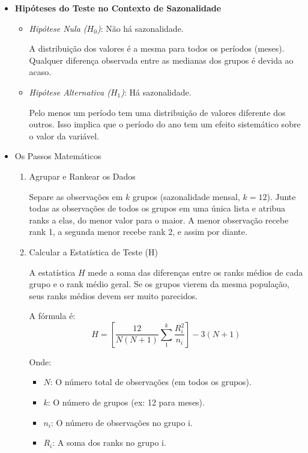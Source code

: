 \documentclass[ 12pt,a4paper ]{article} %
\begin{document}
	\begin{itemize}
		
	
	\item  \textbf{Hipóteses do Teste no Contexto de Sazonalidade}
	
	\begin{itemize}
		
	
	\item \textit{Hipótese Nula ($H_0$)}: Não há sazonalidade.
	
	A distribuição dos valores é a mesma para todos os períodos (meses). Qualquer diferença observada entre as medianas dos grupos é devida ao acaso.
	
	\item \textit{Hipótese Alternativa ($H_1$)}: Há sazonalidade.
	
	Pelo menos um período tem uma distribuição de valores diferente dos outros. Isso implica que o período do ano tem um efeito sistemático sobre o valor da variável.
\end{itemize}
	\item Os Passos Matemáticos 
	
	\begin{enumerate}
		\item Agrupar e Rankear os Dados
		
		Separe as observações em $k$ grupos (sazonalidade mensal, $k=12$).
		Junte todas as observações de todos os grupos em uma única lista e atribua ranks a elas, do menor valor para o maior. A menor observação recebe rank 1, a segunda menor recebe rank 2, e assim por diante.
		
		\item Calcular a Estatística de Teste (H)
		
		A estatística $H$ mede a soma das diferenças entre os ranks médios de cada grupo e o rank médio geral. Se os grupos vierem da mesma população, seus ranks médios devem ser muito parecidos.
		
		A fórmula é: $$H = \left[\dfrac{12}{N(N+1)} \sum_{1}^{k}\dfrac{R_i^2}{n_i}\right] - 3 (N+1)$$
		
		Onde:
		\begin{itemize}
			
		
		\item $N$: O número total de observações (em todos os grupos).
		
		\item $k$: O número de grupos (ex: 12 para meses).
		
		\item $n_i$: O número de observações no grupo i.
		\item $R_i$: A soma dos ranks no grupo i.
		

\end{itemize}
\end{enumerate}
\end{itemize}
\end{document}
